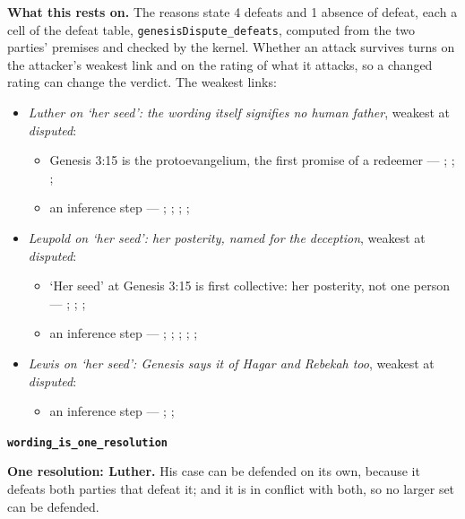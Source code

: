 \documentclass[11pt]{article}
\begin{document}
\par\noindent\textbf{What this rests on.} The reasons state 4 defeats and 1 absence of defeat, each a cell of the defeat table, \texttt{genesis\allowbreak{}Dispute\_\allowbreak{}defeats}, computed from the two parties' premises and checked by the kernel. Whether an attack survives turns on the attacker's weakest link and on the rating of what it attacks, so a changed rating can change the verdict. The weakest links:
\begin{itemize}
\item \emph{Luther on ‘her seed’: the wording itself signifies no human father}, weakest at \emph{disputed}:
\begin{itemize}
\item Genesis 3:15 is the protoevangelium, the first promise of a redeemer --- \cite[167]{leupold-exposition-genesis-1942}; \cite[102]{keil-delitzsch-pentateuch-1866}; \cite{miravalle-meet-your-mother-2014}; \cite[318]{lewis-womans-seed-1991}
\item an inference step --- \cite[298--299]{luther-on-the-creation-1904}; \cite[ad loc. Gen 3:15]{henry-commentary-whole-bible}; \cite[167--169]{leupold-exposition-genesis-1942}; \cite[102]{keil-delitzsch-pentateuch-1866}; \cite[319]{lewis-womans-seed-1991}
\end{itemize}
\item \emph{Leupold on ‘her seed’: her posterity, named for the deception}, weakest at \emph{disputed}:
\begin{itemize}
\item ‘Her seed’ at Genesis 3:15 is first collective: her posterity, not one person --- \cite[167--169]{leupold-exposition-genesis-1942}; \cite[170]{calvin-commentary-genesis-1847}; \cite[101]{keil-delitzsch-pentateuch-1866}; \cite[145--146]{collins-syntactical-note-1997}
\item an inference step --- \cite[169]{leupold-exposition-genesis-1942}; \cite[101--102]{keil-delitzsch-pentateuch-1866}; \cite[170]{calvin-commentary-genesis-1847}; \cite[III.23.7]{irenaeus-against-heresies-180}; \cite[V.21.1]{irenaeus-against-heresies-180}; \cite[ad loc. Gen 3:15]{henry-commentary-whole-bible}
\end{itemize}
\item \emph{Lewis on ‘her seed’: Genesis says it of Hagar and Rebekah too}, weakest at \emph{disputed}:
\begin{itemize}
\item an inference step --- \cite[299--300]{lewis-womans-seed-1991}; \cite[319]{lewis-womans-seed-1991}; \cite{akin-woman-seed-serpent-1999}
\end{itemize}
\end{itemize}
\par\medskip\noindent\textbf{\texttt{wording\_\allowbreak{}is\_\allowbreak{}one\_\allowbreak{}resolution}}\par\nobreak\noindent
\textbf{One resolution: Luther.} His case can be defended on its own, because it defeats both parties that defeat it; and it is in conflict with both, so no larger set can be defended.
\end{document}
